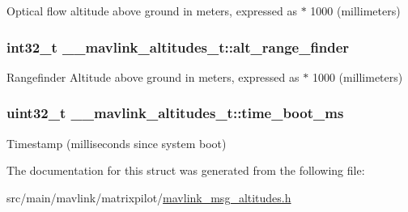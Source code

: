 Optical flow altitude above ground in meters, expressed as $\ast$ 1000 (millimeters) 

\hypertarget{struct____mavlink__altitudes__t_a157ed8703ee42ca4b2a02149bceae40b}{
\subsubsection[{alt\+\_\+range\+\_\+finder}]{\setlength{\rightskip}{0pt plus 5cm}int32\+\_\+t \+\_\+\+\_\+mavlink\+\_\+altitudes\+\_\+t\+::alt\+\_\+range\+\_\+finder}}\label{struct____mavlink__altitudes__t_a157ed8703ee42ca4b2a02149bceae40b}


Rangefinder Altitude above ground in meters, expressed as $\ast$ 1000 (millimeters) 

\hypertarget{struct____mavlink__altitudes__t_acca23c26c65fd180317986306f24e7f6}{
\subsubsection[{time\+\_\+boot\+\_\+ms}]{\setlength{\rightskip}{0pt plus 5cm}uint32\+\_\+t \+\_\+\+\_\+mavlink\+\_\+altitudes\+\_\+t\+::time\+\_\+boot\+\_\+ms}}\label{struct____mavlink__altitudes__t_acca23c26c65fd180317986306f24e7f6}


Timestamp (milliseconds since system boot) 



The documentation for this struct was generated from the following file\+:\begin{DoxyCompactItemize}
\item 
src/main/mavlink/matrixpilot/\hyperlink{mavlink__msg__altitudes_8h}{mavlink\+\_\+msg\+\_\+altitudes.\+h}\end{DoxyCompactItemize}
